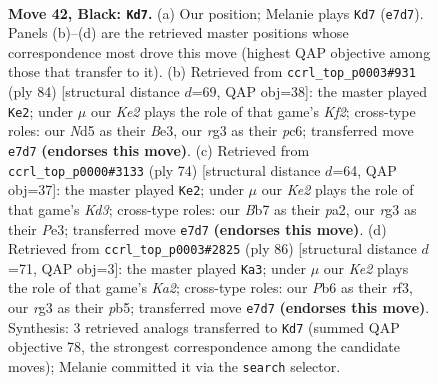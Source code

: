 \documentclass[11pt]{article}
\begin{document}
\clearpage

\begin{figure}[p]\centering
\begin{subfigure}{0.46\textwidth}\centering
\resizebox{\linewidth}{!}{%
\newchessgame
\chessboard[
  setfen={8/1b2kp2/qp6/1N1nQK2/P2Pp3/6R1/8/7R b - - 4 42},
  showmover=false,
  pgfstyle=straightmove, color=movearrow, markmove={e7-d7}
]}
\caption{}
\end{subfigure}\hfill
\begin{subfigure}{0.46\textwidth}\centering
\resizebox{\linewidth}{!}{%
\newchessgame
\chessboard[
  setfen={3N2k1/7p/2p2qr1/8/2P5/3PB2Q/2P2KP1/8 w - - 1 43},
  showmover=false,
  pgfstyle=straightmove, color=movearrow, markmove={f2-e2}
]}
\caption{}
\end{subfigure}
\\[4pt]
\begin{subfigure}{0.46\textwidth}\centering
\resizebox{\linewidth}{!}{%
\newchessgame
\chessboard[
  setfen={1k6/3Q4/1pp5/3n1B2/6p1/2qKP1P1/p1N2PP1/8 w - - 0 38},
  showmover=false,
  pgfstyle=straightmove, color=movearrow, markmove={d3-e2}
]}
\caption{}
\end{subfigure}\hfill
\begin{subfigure}{0.46\textwidth}\centering
\resizebox{\linewidth}{!}{%
\newchessgame
\chessboard[
  setfen={2Q5/5k2/p3p3/1p2P3/1P3q2/2N2r2/KPP5/8 w - - 11 44},
  showmover=false,
  pgfstyle=straightmove, color=movearrow, markmove={a2-a3}
]}
\caption{}
\end{subfigure}
\caption{\textbf{Move 42, Black: \texttt{Kd7}.} (a) Our position; Melanie plays \texttt{Kd7} (\texttt{e7d7}). Panels (b)--(d) are the retrieved master positions whose correspondence most drove this move (highest QAP objective among those that transfer to it). (b) Retrieved from \texttt{ccrl\_top\_p0003\#931} (ply 84) [structural distance $d$=69, QAP obj=38]: the master played \texttt{Ke2}; under $\mu$ our \emph{Ke2} plays the role of that game's \emph{Kf2}; cross-type roles: our \emph{N}d5 as their \emph{B}e3, our \emph{r}g3 as their \emph{p}c6; transferred move \texttt{e7d7} \textbf{(endorses this move)}. (c) Retrieved from \texttt{ccrl\_top\_p0000\#3133} (ply 74) [structural distance $d$=64, QAP obj=37]: the master played \texttt{Ke2}; under $\mu$ our \emph{Ke2} plays the role of that game's \emph{Kd3}; cross-type roles: our \emph{B}b7 as their \emph{p}a2, our \emph{r}g3 as their \emph{P}e3; transferred move \texttt{e7d7} \textbf{(endorses this move)}. (d) Retrieved from \texttt{ccrl\_top\_p0003\#2825} (ply 86) [structural distance $d$=71, QAP obj=3]: the master played \texttt{Ka3}; under $\mu$ our \emph{Ke2} plays the role of that game's \emph{Ka2}; cross-type roles: our \emph{P}b6 as their \emph{r}f3, our \emph{r}g3 as their \emph{p}b5; transferred move \texttt{e7d7} \textbf{(endorses this move)}. Synthesis: 3 retrieved analogs transferred to \texttt{Kd7} (summed QAP objective 78, the strongest correspondence among the candidate moves); Melanie committed it via the \texttt{search} selector.}
\label{fig:thought-m83}
\end{figure}
\end{document}
